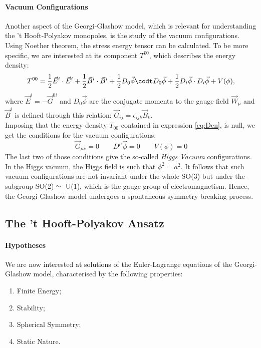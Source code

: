 \paragraph{Vacuum Configurations}Another aspect of the Georgi-Glashow model, which is relevant for understanding the 't Hooft-Polyakov monopoles, is the study of the vacuum configurations.\\
Using Noether theorem, the stress energy tensor can be calculated. To be more specific, we are interested at its component $T^{00}$, which describes the energy density: 
\begin{equation}
T^{00} = \frac{1}{2} \Vec{E}^i \cdot  \Vec{E}^i + \frac{1}{2} \Vec{B}^i \cdot \Vec{B}^i +\frac{1}{2} D_0 \Vec{\phi} \codt D_0 \Vec{\phi} +\frac{1}{2} D_i \Vec{\phi} \cdot  D_i \Vec{\phi} + V(\phi),
\label{eq:Den}
\end{equation}
where $\Vec{E}^i = - \Vec{G}^{0i}$ and $D_0 \Vec{\phi}$ are the conjugate momenta to the gauge field $\Vec{W}_{\mu}$ and $\Vec{B}^i$ is defined through this relation: $ \Vec{G}_{ij} = \epsilon_{ijk} \Vec{B}_k$.\\
Imposing that the energy density $T_{00}$ contained in expression \ref{eq:Den}, is null, we get the conditions for the vacuum configurations: 
\begin{equation}
\Vec{G}_{\mu \nu} = 0 \qquad D^{\mu} \Vec{\phi}  = 0 \qquad V(\phi)=0
\end{equation}
The last two of those conditions give the so-called \textit{Higgs Vacuum} configurations. 
In the Higgs vacuum, the Higgs field is such that $\phi^2 = a^2$. It follows that such vacuum configurations are not invariant under the whole SO(3) but under the subgroup SO(2)$\simeq$ U(1), which is the gauge group of electromagnetism. Hence, the Georgi-Glashow model undergoes a spontaneous symmetry breaking process.

\subsection{The 't Hooft-Polyakov Ansatz}
 \paragraph{Hypotheses}We are now interested at solutions of the Euler-Lagrange equations of the Georgi-Glashow model, characterised by the following properties: 
 \begin{enumerate}
     \item Finite Energy; 
     \item Stability; 
     \item Spherical Symmetry;
     \item Static Nature.
 \end{enumerate}
 
